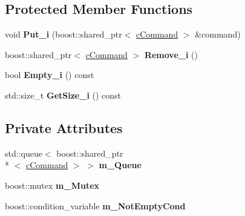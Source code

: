 \subsection*{Protected Member Functions}
\begin{DoxyCompactItemize}
\item 
\hypertarget{classengine_1_1cCommandQueue_aeb88bbb3ee34d79b6498c1077fe051c8}{void {\bfseries Put\-\_\-i} (boost\-::shared\-\_\-ptr$<$ \hyperlink{classengine_1_1cCommand}{c\-Command} $>$ \&command)}\label{classengine_1_1cCommandQueue_aeb88bbb3ee34d79b6498c1077fe051c8}

\item 
\hypertarget{classengine_1_1cCommandQueue_a410cb146fd123de1766bf8fee2827485}{boost\-::shared\-\_\-ptr$<$ \hyperlink{classengine_1_1cCommand}{c\-Command} $>$ {\bfseries Remove\-\_\-i} ()}\label{classengine_1_1cCommandQueue_a410cb146fd123de1766bf8fee2827485}

\item 
\hypertarget{classengine_1_1cCommandQueue_a7c8a6bd8dae5c050634cededcb77ef4d}{bool {\bfseries Empty\-\_\-i} () const }\label{classengine_1_1cCommandQueue_a7c8a6bd8dae5c050634cededcb77ef4d}

\item 
\hypertarget{classengine_1_1cCommandQueue_a2b729f6d9866c6e9b50e142f7e475b05}{std\-::size\-\_\-t {\bfseries Get\-Size\-\_\-i} () const }\label{classengine_1_1cCommandQueue_a2b729f6d9866c6e9b50e142f7e475b05}

\end{DoxyCompactItemize}
\subsection*{Private Attributes}
\begin{DoxyCompactItemize}
\item 
\hypertarget{classengine_1_1cCommandQueue_a505e669143dc3a07ad178f689fa61e0c}{std\-::queue$<$ boost\-::shared\-\_\-ptr\\*
$<$ \hyperlink{classengine_1_1cCommand}{c\-Command} $>$ $>$ {\bfseries m\-\_\-\-Queue}}\label{classengine_1_1cCommandQueue_a505e669143dc3a07ad178f689fa61e0c}

\item 
\hypertarget{classengine_1_1cCommandQueue_a3382d012fe90188199630bef438d7901}{boost\-::mutex {\bfseries m\-\_\-\-Mutex}}\label{classengine_1_1cCommandQueue_a3382d012fe90188199630bef438d7901}

\item 
\hypertarget{classengine_1_1cCommandQueue_a7edc3ed909364aca4956ff6b8d95b912}{boost\-::condition\-\_\-variable {\bfseries m\-\_\-\-Not\-Empty\-Cond}}\label{classengine_1_1cCommandQueue_a7edc3ed909364aca4956ff6b8d95b912}

\end{DoxyCompactItemize}


